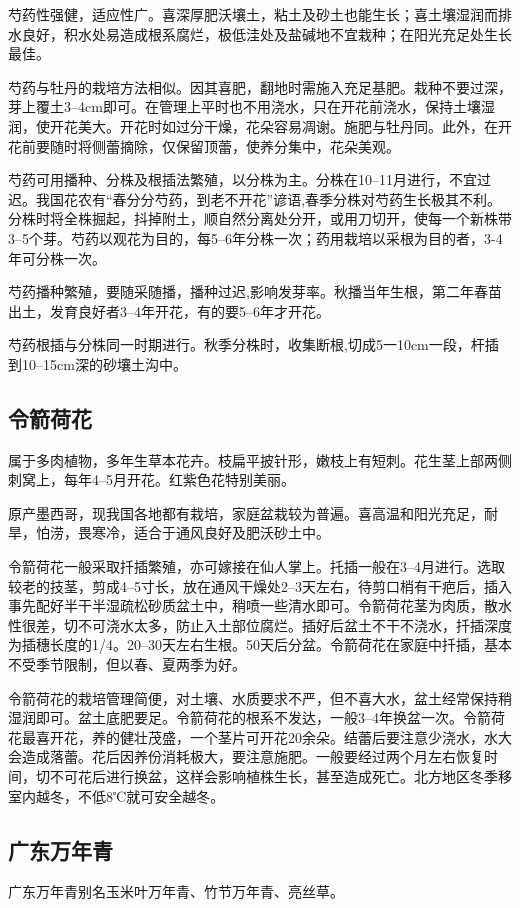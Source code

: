 \documentclass{ctexbook}
\begin{document}
芍药性强健，适应性广。喜深厚肥沃壤土，粘土及砂土也能生长；喜土壤湿润而排水良好，积水处易造成根系腐烂，极低洼处及盐碱地不宜栽种；在阳光充足处生长最佳。

芍药与牡丹的栽培方法相似。因其喜肥，翻地时需施入充足基肥。栽种不要过深，芽上覆土3--4cm即可。在管理上平时也不用浇水，只在开花前浇水，保持土壤湿润，使开花美大。开花时如过分干燥，花朵容易凋谢。施肥与牡丹同。此外，在开花前要随时将侧蕾摘除，仅保留顶蕾，使养分集中，花朵美观。

芍药可用播种、分株及根插法繁殖，以分株为主。分株在10--11月进行，不宜过迟。我国花农有“春分分芍药，到老不开花”谚语,春季分株对芍药生长极其不利。分株时将全株掘起，抖掉附土，顺自然分离处分开，或用刀切开，使每一个新株带3--5个芽。芍药以观花为目的，每5--6年分株一次；药用栽培以采根为目的者，3-4年可分株一次。

芍药播种繁殖，要随采随播，播种过迟,影响发芽率。秋播当年生根，第二年春苗出土，发育良好者3--4年开花，有的要5--6年才开花。

芍药根插与分株同一时期进行。秋季分株时，收集断根,切成5一10cm一段，杆插到10--15cm深的砂壤土沟中。
\subsection{令箭荷花}
属于多肉植物，多年生草本花卉。枝扁平披针形，嫩枝上有短刺。花生茎上部两侧刺窝上，每年4--5月开花。红紫色花特别美丽。

原产墨西哥，现我国各地都有栽培，家庭盆栽较为普遍。喜高温和阳光充足，耐旱，怕涝，畏寒冷，适合于通风良好及肥沃砂土中。

令箭荷花一般采取扦插繁殖，亦可嫁接在仙人掌上。托插一般在3--4月进行。选取较老的技茎，剪成4--5寸长，放在通风干燥处2--3天左右，待剪口梢有干疤后，插入事先配好半干半湿疏松砂质盆土中，稍喷一些清水即可。令箭荷花茎为肉质，散水性很差，切不可浇水太多，防止入土部位腐烂。插好后盆土不干不浇水，扦插深度为插穗长度的1/4。20--30天左右生根。50天后分盆。令箭荷花在家庭中扦插，基本不受季节限制，但以春、夏两季为好。

令箭荷花的栽培管理简便，对土壤、水质要求不严，但不喜大水，盆土经常保持稍湿润即可。盆土底肥要足。令箭荷花的根系不发达，一般3--4年换盆一次。令箭荷花最喜开花，养的健壮茂盛，一个茎片可开花20余朵。结蕾后要注意少浇水，水大会造成落蕾。花后因养份消耗极大，要注意施肥。一般要经过两个月左右恢复时间，切不可花后进行换盆，这样会影响植株生长，甚至造成死亡。北方地区冬季移室内越冬，不低8℃就可安全越冬。
\subsection{广东万年青}
广东万年青别名玉米叶万年青、竹节万年青、亮丝草。
\end{document}
